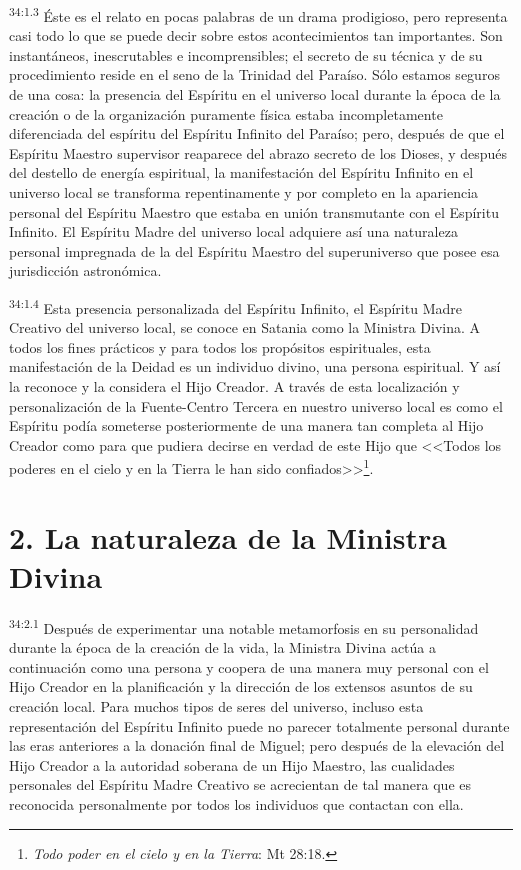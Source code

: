 \par
\textsuperscript{34:1.3} Éste es el relato en pocas palabras de un drama prodigioso, pero representa casi todo lo que se puede decir sobre estos acontecimientos tan importantes. Son instantáneos, inescrutables e incomprensibles; el secreto de su técnica y de su procedimiento reside en el seno de la Trinidad del Paraíso. Sólo estamos seguros de una cosa: la presencia del Espíritu en el universo local durante la época de la creación o de la organización puramente física estaba incompletamente diferenciada del espíritu del Espíritu Infinito del Paraíso; pero, después de que el Espíritu Maestro supervisor reaparece del abrazo secreto de los Dioses, y después del destello de energía espiritual, la manifestación del Espíritu Infinito en el universo local se transforma repentinamente y por completo en la apariencia personal del Espíritu Maestro que estaba en unión transmutante con el Espíritu Infinito. El Espíritu Madre del universo local adquiere así una naturaleza personal impregnada de la del Espíritu Maestro del superuniverso que posee esa jurisdicción astronómica.

\par
\textsuperscript{34:1.4} Esta presencia personalizada del Espíritu Infinito, el Espíritu Madre Creativo del universo local, se conoce en Satania como la Ministra Divina. A todos los fines prácticos y para todos los propósitos espirituales, esta manifestación de la Deidad es un individuo divino, una persona espiritual. Y así la reconoce y la considera el Hijo Creador. A través de esta localización y personalización de la Fuente-Centro Tercera en nuestro universo local es como el Espíritu podía someterse posteriormente de una manera tan completa al Hijo Creador como para que pudiera decirse en verdad de este Hijo que <<Todos los poderes en el cielo y en la Tierra le han sido confiados>>\footnote{\textit{Todo poder en el cielo y en la Tierra}: Mt 28:18.}.

\section*{2. La naturaleza de la Ministra Divina}
\par
\textsuperscript{34:2.1} Después de experimentar una notable metamorfosis en su personalidad durante la época de la creación de la vida, la Ministra Divina actúa a continuación como una persona y coopera de una manera muy personal con el Hijo Creador en la planificación y la dirección de los extensos asuntos de su creación local. Para muchos tipos de seres del universo, incluso esta representación del Espíritu Infinito puede no parecer totalmente personal durante las eras anteriores a la donación final de Miguel; pero después de la elevación del Hijo Creador a la autoridad soberana de un Hijo Maestro, las cualidades personales del Espíritu Madre Creativo se acrecientan de tal manera que es reconocida personalmente por todos los individuos que contactan con ella.

